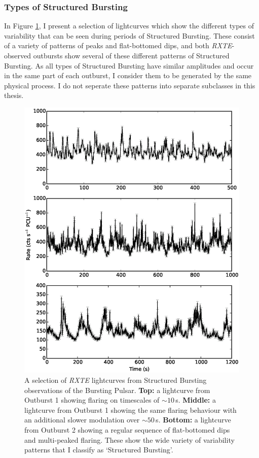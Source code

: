 \subsubsection{Types of Structured Bursting}
\label{sec:struc_var}

\par In Figure \ref{fig:Types_Struc}, I present a selection of lightcurves which show the different types of variability that can be seen during periods of Structured Bursting.  These consist of a variety of patterns of peaks and flat-bottomed dips, and both \textit{RXTE}-observed outbursts show several of these different patterns of Structured Bursting.  As all types of Structured Bursting have similar amplitudes and occur in the same part of each outburst, I consider them to be generated by the same physical process.  I do not seperate these patterns into separate subclasses in this thesis.

\begin{figure}
  \centering
  \includegraphics[width=.9\linewidth, trim={0.8cm 0 1.5cm 0},clip]{images/many_struc.eps}
  \caption[A selection of \textit{RXTE} lightcurves from Structured Bursting observations of the Bursting Pulsar.]{\small A selection of \textit{RXTE} lightcurves from Structured Bursting observations of the Bursting Pulsar.  \textbf{Top:} a lightcurve from Outburst 1 showing flaring on timescales of $\sim10$\,s.  \textbf{Middle:} a lightcurve from Outburst 1 showing the same flaring behaviour with an additional slower modulation over $\sim50$\,s.  \textbf{Bottom:} a lightcurve from Outburst 2 showing a regular sequence of flat-bottomed dips and multi-peaked flaring.  These show the wide variety of variability patterns that I classify as `Structured Bursting'.}
  \label{fig:Types_Struc}
\end{figure}

